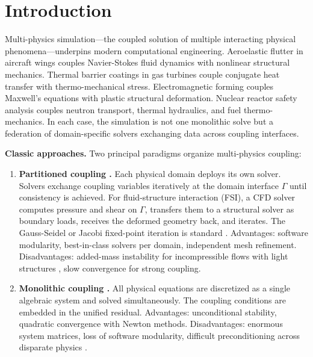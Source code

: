 \documentclass[11pt,a4paper]{article}
\theoremstyle{definition}
\begin{document}
\section{Introduction }

Multi-physics simulation---the coupled solution of multiple interacting physical phenomena---underpins modern computational engineering. Aeroelastic flutter in aircraft wings couples Navier-Stokes fluid dynamics with nonlinear structural mechanics. Thermal barrier coatings in gas turbines couple conjugate heat transfer with thermo-mechanical stress. Electromagnetic forming couples Maxwell's equations with plastic structural deformation. Nuclear reactor safety analysis couples neutron transport, thermal hydraulics, and fuel thermo-mechanics. In each case, the simulation is not one monolithic solve but a federation of domain-specific solvers exchanging data across coupling interfaces.

\textbf{Classic approaches.} Two principal paradigms organize multi-physics coupling:

\begin{enumerate}[label=(\roman*)]
    \item \textbf{Partitioned coupling .} Each physical domain deploys its own solver. Solvers exchange coupling variables iteratively at the domain interface $\Gamma$ until consistency is achieved. For fluid-structure interaction (FSI), a CFD solver computes pressure and shear on $\Gamma$, transfers them to a structural solver as boundary loads, receives the deformed geometry back, and iterates. The Gauss-Seidel or Jacobi fixed-point iteration is standard \cite{Farhat1998,Piperno2001}. Advantages: software modularity, best-in-class solvers per domain, independent mesh refinement. Disadvantages: added-mass instability for incompressible flows with light structures \cite{Causin2005}, slow convergence for strong coupling.
    \item \textbf{Monolithic coupling .} All physical equations are discretized as a single algebraic system and solved simultaneously. The coupling conditions are embedded in the unified residual. Advantages: unconditional stability, quadratic convergence with Newton methods. Disadvantages: enormous system matrices, loss of software modularity, difficult preconditioning across disparate physics \cite{Heil2008}.
\end{enumerate}
\end{document}
